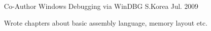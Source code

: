 

\begin{cventries}

  \cventry
    {Co-Author} %
    {Windows Debugging via WinDBG} %
    {S.Korea}
    {Jul. 2009} %
    {
      \begin{cvitems} %
        \item {Wrote chapters about basic assembly language, memory layout etc.}
      \end{cvitems}
    }

\end{cventries}
